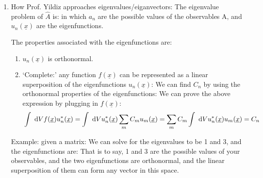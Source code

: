 \documentclass{school-22.101-notes}
\begin{document}
\begin{enumerate}
\item How Prof. Yildiz approaches eigenvalues/eiganvectors:  The eigenvalue problem of $\hat{A}$ is:
in which $a_n$ are the possible values of the observables A, and $u_n(\underline{x})$ are the eigenfunctions. 

The properties associated with the eigenfunctions are: 
\begin{enumerate}
\item $u_n(\underline{x})$ is orthonormal. 

\item `Complete:' any function $f(\underline{x})$ can be represented as a linear superposition of the eigenfunctions $u_n(\underline{x})$:
  We can find $C_n$ by using the orthonormal properties of the eigenfunctions:
  We can prove the above expression by plugging in $f(\underline{x})$:
  \begin{align}
    & \int \mbox{ }\mathrm{d} V f(\underline{x}) u_n^* (\underline{x}) = \int \mbox{ }\mathrm{d} V  u_n^* (\underline{x}) \displaystyle\sum_m C_m u_m(\underline{x}) = \displaystyle\sum_m C_m \int \mbox{ }\mathrm{d} V u_n^*(\underline{x}) u_m (\underline{x}) = C_n
  \end{align}
\end{enumerate}

Example: given a matrix:
We can solve for the eigenvalues to be 1 and 3, and the eigenfunctions are:
That is to say, 1 and 3 are the possible values of your observables, and the two eigenfunctions are orthonormal, and the linear superposition of them can form any vector in this space.
\end{enumerate}
\end{document}
